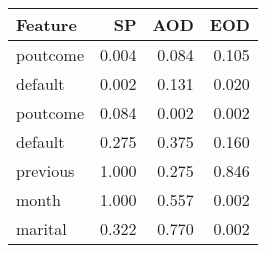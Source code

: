 \begin{tabular}{lrrr}
\toprule
Feature & SP & AOD & EOD \\
\midrule
poutcome & 0.004 & 0.084 & 0.105 \\
default & 0.002 & 0.131 & 0.020 \\
poutcome & 0.084 & 0.002 & 0.002 \\
default & 0.275 & 0.375 & 0.160 \\
previous & 1.000 & 0.275 & 0.846 \\
month & 1.000 & 0.557 & 0.002 \\
marital & 0.322 & 0.770 & 0.002 \\
\bottomrule
\end{tabular}
